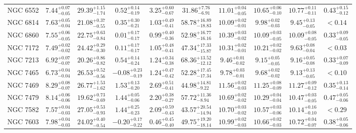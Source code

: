 \documentclass[onecolumn]{mn2e}
\begin{document}
\begin{landscape}
{\begin{center}
\begin{longtable}{lccccccccc}
NGC 6552 & $7.44_{-0.05}^{+0.07}$ & $29.39_{-1.74}^{+1.15}$ & $0.52_{-0.19}^{+0.14}$ & $3.25_{-0.67}^{+0.60}$ &$31.86_{-6.91}^{+7.76}$ & $11.01_{-0.05}^{+0.04}$ & $10.65_{-0.10}^{+0.06}$ & $10.77_{-0.11}^{+0.11}$ & $0.43_{-0.12}^{+0.15}$ \\
NGC 6814 & $7.63_{-0.04}^{+0.05}$ & $21.08_{-0.55}^{+0.37}$ & $0.35_{-0.21}^{+0.30}$ & $1.03_{-0.41}^{+0.49}$ &$58.78_{-18.83}^{+16.89}$ & $10.09_{-0.01}^{+0.02}$ & $9.98_{-0.03}^{+0.02}$ & $9.45_{-0.05}^{+0.13}$ & $<0.14$ \\
NGC 6860 & $7.55_{-0.05}^{+0.06}$ & $22.75_{-0.84}^{+0.63}$ & $0.01_{-0.17}^{+0.17}$ & $0.99_{-0.36}^{+0.40}$ &$52.98_{-16.16}^{+16.77}$ & $10.39_{-0.02}^{+0.03}$ & $10.09_{-0.05}^{+0.03}$ & $10.09_{-0.05}^{+0.08}$ & $0.33_{-0.05}^{+0.09}$ \\
NGC 7172 & $7.49_{-0.02}^{+0.02}$ & $24.42_{-0.30}^{+0.29}$ & $0.11_{-0.17}^{+0.17}$ & $1.05_{-0.41}^{+0.48}$ &$47.34_{-15.87}^{+17.33}$ & $10.31_{-0.01}^{+0.02}$ & $10.21_{-0.02}^{+0.02}$ & $9.63_{-0.04}^{+0.08}$ & $<0.03$ \\
NGC 7213 & $6.92_{-0.07}^{+0.07}$ & $20.26_{-0.82}^{+0.86}$ & $0.54_{-0.24}^{+0.14}$ & $1.24_{-0.38}^{+0.34}$ &$68.36_{-12.12}^{+13.52}$ & $9.46_{-0.02}^{+0.01}$ & $9.15_{-0.05}^{+0.05}$ & $9.16_{-0.08}^{+0.05}$ & $0.33_{-0.09}^{+0.07}$ \\
NGC 7465 & $6.73_{-0.04}^{+0.04}$ & $26.53_{-0.56}^{+0.52}$ & $-0.08_{-0.19}^{+0.23}$ & $1.24_{-0.42}^{+0.47}$ &$52.28_{-17.34}^{+17.45}$ & $9.78_{-0.01}^{+0.03}$ & $9.68_{-0.02}^{+0.02}$ & $9.13_{-0.05}^{+0.13}$ & $<0.10$ \\
NGC 7469 & $8.29_{-0.07}^{+0.08}$ & $26.77_{-1.62}^{+1.53}$ & $1.53_{-0.20}^{+0.13}$ & $2.69_{-0.41}^{+0.51}$ &$44.98_{-9.22}^{+14.81}$ & $11.56_{-0.03}^{+0.02}$ & $11.25_{-0.09}^{+0.08}$ & $11.27_{-0.12}^{+0.09}$ & $0.35_{-0.14}^{+0.13}$ \\
NGC 7479 & $8.14_{-0.06}^{+0.06}$ & $19.62_{-0.69}^{+0.73}$ & $1.44_{-0.06}^{+0.05}$ & $2.20_{-0.27}^{+0.38}$ &$57.72_{-8.94}^{+11.36}$ & $10.69_{-0.02}^{+0.02}$ & $10.29_{-0.04}^{+0.04}$ & $10.47_{-0.05}^{+0.03}$ & $0.47_{-0.06}^{+0.05}$ \\
NGC 7582 & $7.57_{-0.03}^{+0.04}$ & $27.05_{-0.93}^{+0.53}$ & $1.44_{-0.23}^{+0.25}$ & $2.09_{-0.43}^{+0.59}$ &$43.57_{-14.94}^{+20.54}$ & $10.70_{-0.02}^{+0.03}$ & $10.57_{-0.06}^{+0.03}$ & $10.14_{-0.10}^{+0.16}$ & $<0.29$ \\
NGC 7603 & $7.98_{-0.03}^{+0.04}$ & $24.02_{-0.54}^{+0.40}$ & $-0.20_{-0.22}^{+0.17}$ & $0.46_{-0.40}^{+0.45}$ &$49.75_{-18.14}^{+19.20}$ & $10.99_{-0.03}^{+0.02}$ & $10.66_{-0.03}^{+0.02}$ & $10.72_{-0.07}^{+0.04}$ & $0.38_{-0.06}^{+0.05}$ \\

\end{longtable}
\end{center}}
\end{landscape}
\end{document}
